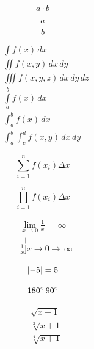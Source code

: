 \begin{center}
\begin{equation*}
	a\cdot b
\end{equation*}

\begin{equation*}
	\frac{a}{b}
\end{equation*}

\begin{align*}
	&\int f(x)\,dx\\
        &\iint f(x,y)\,dx\,dy\\
        &\iiint f(x,y,z)\,dx\,dy\,dz\\
        &\int\limits_{a}^{b}f(x)\,dx\\
        &\int_{a}^{b}f(x)\,dx\\
        &\int_{a}^{b}\int_{c}^{d}f(x,y)\,dx\,dy
\end{align*}

\begin{equation*}
	\sum_{i=1}^n f(x_i) \Delta x
\end{equation*}

\begin{equation*}
	\prod_{i=1}^n f(x_i) \Delta x
\end{equation*}

\begin{align*}
	&\lim_{x \to 0} \frac{1}{x} = \,\infty \\ 
        &\frac{1}{x}\stackrel[] {x \to 0}{\longrightarrow}\,\infty
\end{align*}

\begin{equation*}
	\lvert-5\rvert=5
\end{equation*}

\begin{equation*}
	180^\circ \, 90^\circ
\end{equation*}

\begin{align*}
	&\sqrt{x+1}\\
        &\sqrt[3]{x+1}\\
        &\sqrt[4]{x+1}
\end{align*}


\end{center}
